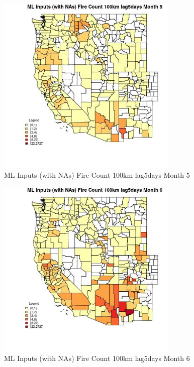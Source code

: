 \begin{figure} 
\centering  
\includegraphics[width=0.77\textwidth]{Code_Outputs/Report_ML_input_PM25_Step4_part_f_de_duplicated_aves_prioritize_24hr_obswNAs_CountyFire_Count_100km_lag5daysmedianMonth5.jpg} 
\caption{\label{fig:Report_ML_input_PM25_Step4_part_f_de_duplicated_aves_prioritize_24hr_obswNAsCountyFire_Count_100km_lag5daysmedianMonth5}ML Inputs (with NAs) Fire Count 100km lag5days Month 5} 
\end{figure} 
 

\begin{figure} 
\centering  
\includegraphics[width=0.77\textwidth]{Code_Outputs/Report_ML_input_PM25_Step4_part_f_de_duplicated_aves_prioritize_24hr_obswNAs_CountyFire_Count_100km_lag5daysmedianMonth6.jpg} 
\caption{\label{fig:Report_ML_input_PM25_Step4_part_f_de_duplicated_aves_prioritize_24hr_obswNAsCountyFire_Count_100km_lag5daysmedianMonth6}ML Inputs (with NAs) Fire Count 100km lag5days Month 6} 
\end{figure} 
 

